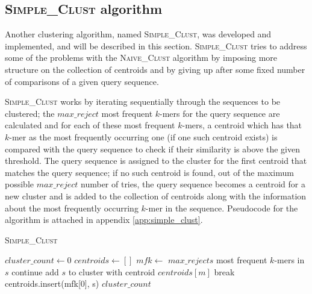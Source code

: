 


\subsection{\textsc{Simple\_Clust} algorithm}

Another clustering algorithm, named \textsc{Simple\_Clust}, was developed and
implemented, and will be described in this section. \textsc{Simple\_Clust}
tries to address some of the problems with the \textsc{Naive\_Clust} algorithm
by imposing more structure on the collection of centroids and by giving up
after some fixed number of comparisons of a given query sequence.

\textsc{Simple\_Clust} works by iterating sequentially through the sequences to
be clustered; the $max\_reject$ most frequent $k$-mers for the query sequence
are calculated and for each of these most frequent $k$-mers, a centroid which
has that $k$-mer as the most frequently occurring one (if one such centroid
exists) is compared with the query sequence to check if their similarity is
above the given threshold. The query sequence is assigned to the cluster for the
first centroid that matches the query sequence; if no such centroid is found,
out of the maximum possible $max\_reject$ number of tries, the query sequence
becomes a centroid for a new cluster and is added to the collection of centroids
along with the information about the most frequently occurring $k$-mer in the
sequence. Pseudocode for the algorithm is attached in appendix \ref{app:simple_clust}.

\begin{algorithm}
  \caption{\textsc{Simple\_Clust}}
  \label{alg:simple_clust}
  \begin{algorithmic}[1]
    \Statex
      \State $cluster\_count \gets 0$
      \State $centroids \gets []$ 
        \State $mfk \gets$ $max\_rejects$ most frequent $k$-mers in $s$
            \State continue
            \State add $s$ to cluster with centroid $centroids[m]$
            \State break
          \EndIf
        \EndFor
          \State centroids.insert(mfk[0], s)
        \EndIf
      \EndFor
      \State \Return $cluster\_count$
    \EndFunction
  \end{algorithmic}
\end{algorithm}

